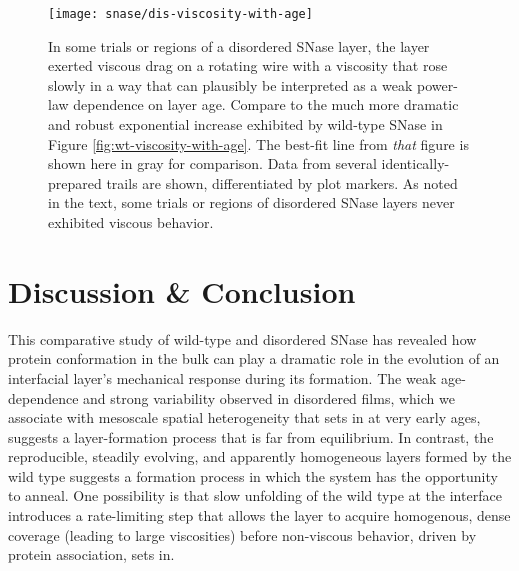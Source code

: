    \begin{figure}
    \centering
    \texttt{[image: snase/dis-viscosity-with-age]}
    \caption{\label{fig:dis-viscosity-with-age}In some trials or regions of a disordered SNase layer, the layer exerted viscous drag on a rotating wire with a viscosity that rose slowly in a way that can plausibly be interpreted as a weak power-law dependence on layer age. Compare to the much more dramatic and robust exponential increase exhibited by wild-type SNase in Figure \ref{fig:wt-viscosity-with-age}. The best-fit line from \emph{that} figure is shown here in gray for comparison. Data from several identically-prepared trails are shown, differentiated by plot markers. As noted in the text, some trials or regions of disordered SNase layers never exhibited viscous behavior.}
    \end{figure}


\section{Discussion \& Conclusion}

This comparative study of wild-type and disordered SNase has revealed how protein conformation in the bulk can play a dramatic role in the evolution of an interfacial layer's mechanical response during its formation. The weak age-dependence and strong variability observed in disordered films, which we associate with mesoscale spatial heterogeneity that sets in at very early ages, suggests a layer-formation process that is far from equilibrium. In contrast, the reproducible, steadily evolving, and apparently homogeneous layers formed by the wild type suggests a formation process in which the system has the opportunity to anneal. One possibility is that slow unfolding of the wild type at the interface introduces a rate-limiting step that allows the layer to acquire homogenous, dense coverage (leading to large viscosities) before non-viscous behavior, driven by protein association, sets in.
